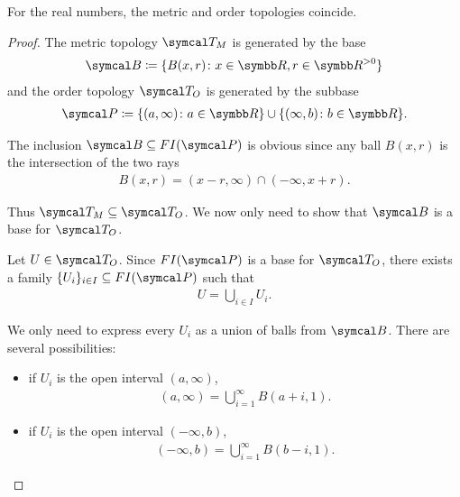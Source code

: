 \begin{theorem}\label{thm:real_metric_and_order_topologies_coincide}
  For the real numbers, the metric and order topologies coincide.
\end{theorem}
\begin{proof}
  The metric topology \( \Cal{T}_M \) is generated by the base
  \begin{align*}
    \Cal{B} \coloneqq \{ B(x, r) \colon x \in \BB{R}, r \in \BB{R}^{>0} \}
  \end{align*}
  and the order topology \( \Cal{T}_O \) is generated by the subbase
  \begin{align*}
    \Cal{P} \coloneqq \{ (a, \infty) \colon a \in \BB{R} \} \cup \{ (\infty, b) \colon b \in \BB{R} \}.
  \end{align*}

  The inclusion \( \Cal{B} \subseteq FI(\Cal{P}) \) is obvious since any ball \( B(x, r) \) is the intersection of the two rays
  \begin{align*}
    B(x, r) = (x - r, \infty) \cap (-\infty, x + r).
  \end{align*}

  Thus \( \Cal{T}_M \subseteq \Cal{T}_O \). We now only need to show that \( \Cal{B} \) is a base for \( \Cal{T}_O \).

  Let \( U \in \Cal{T}_O \). Since \( FI(\Cal{P}) \) is a base for \( \Cal{T}_O \), there exists a family \( \{ U_i \}_{i \in I} \subseteq FI(\Cal{P}) \) such that
  \begin{align*}
    U = \bigcup_{i \in I} U_i.
  \end{align*}

  We only need to express every \( U_i \) as a union of balls from \( \Cal{B} \). There are several possibilities:
  \begin{itemize}
    \item if \( U_i \) is the open interval \( (a, \infty) \),
    \begin{align*}
      (a, \infty) = \bigcup_{i=1}^\infty B(a + i, 1).
    \end{align*}

    \item if \( U_i \) is the open interval \( (-\infty, b) \),
    \begin{align*}
      (-\infty, b) = \bigcup_{i=1}^\infty B(b - i, 1).
    \end{align*}


\end{itemize}
\end{proof}
